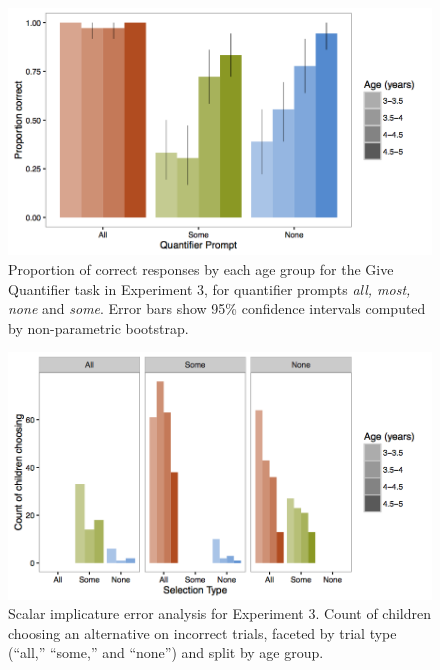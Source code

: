 \documentclass[man]{apa2}
\begin{document}
\begin{figure}
 \begin{center}
  \includegraphics[width=4.5in]{figures/exp3_GQperf.png}
  \caption{\label{fig:exp3_GQright} Proportion of correct responses by each age group for the Give Quantifier task in Experiment 3, for quantifier prompts \textit{all, most, none} and \textit{some}. Error bars show 95\% confidence intervals computed by non-parametric bootstrap.}
 \end{center}
\end{figure}

\begin{figure}
 \begin{center}
  \includegraphics[width=4.5in]{figures/exp3_SIwrong.png}
  \caption{\label{fig:exp3_wrong} Scalar implicature error analysis for Experiment 3. Count of children choosing an alternative on incorrect trials, faceted by trial type (``all,'' ``some,'' and ``none'') and split by age group.}
 \end{center}
\end{figure}
\end{document}
